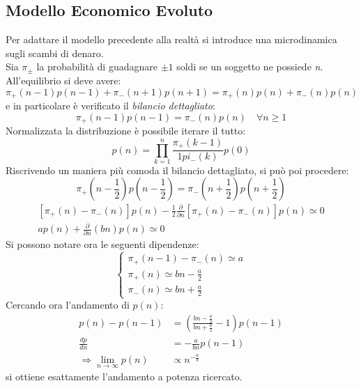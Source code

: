 \documentclass[12pt, a4paper]{article}
\theoremstyle{theorem}
\begin{document}
		\subsection{Modello Economico Evoluto}
			Per adattare il modello precedente alla realtà si introduce una microdinamica sugli scambi di denaro.\\
			Sia $\pi_\pm$ la probabilità di guadagnare $\pm 1$ soldi se un soggetto ne possiede \textit{n}. All'equilibrio si deve avere:
			\begin{equation}
				\pi_+(n-1)p(n-1)+\pi_-(n+1)p(n+1)=\pi_+(n)p(n)+\pi_-(n)p(n)
			\end{equation}
			e in particolare è verificato il \textit{bilancio dettagliato}:
			\begin{equation}
				\pi_+(n-1)p(n-1)=\pi_-(n)p(n)\quad \forall n\geq 1
			\end{equation}
			Normalizzata la distribuzione è possibile iterare il tutto:
			\begin{equation}
				p(n)=\prod_{k=1}^n\frac{\pi_+(k-1)}{1pi_-(k)}p(0)
			\end{equation}
			Riscrivendo un maniera più comoda il bilancio dettagliato, si può poi procedere:
			\begin{equation}
				\pi_+(n-\frac{1}{2})p(n-\frac{1}{2})=\pi_-(n+\frac{1}{2})p(n+\frac{1}{2})
			\end{equation}
			\begin{equation}
				\begin{split}
					[\pi_+(n)-\pi_-(n)]p(n)-\frac{1}{2}\frac{\partial}{\partial n}[\pi_+(n)-\pi_-(n)]p(n)\simeq 0\\
					ap(n)+\frac{\partial}{\partial n}(bn)p(n)\simeq 0
				\end{split}
			\end{equation}
			Si possono notare ora le seguenti dipendenze:
			\begin{equation}
				\begin{cases}
					\pi_+(n-1)-\pi_-(n)\simeq a\\
					\pi_+(n)\simeq bn-\frac{a}{2}\\
					\pi_-(n)\simeq bn+\frac{a}{2}
				\end{cases}
			\end{equation}
			Cercando ora l'andamento di $p(n)$:
			\begin{equation}
				\begin{split}
					p(n)-p(n-1)&=\left(\frac{bn-\frac{a}{2}}{bn+\frac{a}{2}}-1\right)p(n-1)\\
					\frac{dp}{dn}&=-\frac{a}{bn}p(n-1)\\
					\Rightarrow\lim_{n\to\infty}p(n)&\propto n^{-\frac{a}{b}}
				\end{split}
			\end{equation}
			si ottiene esattamente l'andamento a potenza ricercato.
\end{document}
